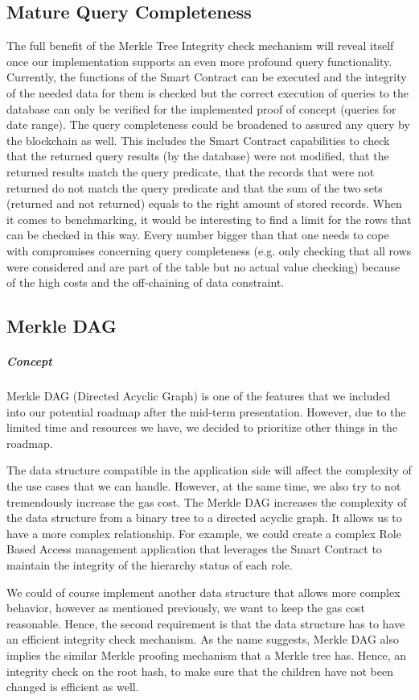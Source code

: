 \subsection{Mature Query Completeness}
The full benefit of the Merkle Tree Integrity check mechanism will reveal itself once our implementation supports an even more profound query functionality. Currently, the functions of the Smart Contract can be executed and the integrity of the needed data for them is checked but the correct execution of queries to the database can only be verified for the implemented proof of concept (queries for date range). The query completeness could be broadened to assured any query by the blockchain as well. This includes the Smart Contract capabilities to check that the returned query results (by the database) were not modified, that the returned results match the query predicate, that the records that were not returned do not match the query predicate and that the sum of the two sets (returned and not returned) equals to the right amount of stored records.
When it comes to benchmarking, it would be interesting to find a limit for the rows that can be checked in this way. Every number bigger than that one needs to cope with compromises concerning query completeness (e.g. only checking that all rows were considered and are part of the table but no actual value checking) because of the high costs and the off-chaining of data constraint.

\subsection{Merkle DAG}
\subparagraph{Concept}
Merkle DAG (Directed Acyclic Graph) is one of the features that we included into our potential roadmap after the mid-term presentation. However, due to the limited time and resources we have, we decided to prioritize other things in the roadmap.

The data structure compatible in the application side will affect the complexity of the use cases that we can handle. However, at the same time, we also try to not tremendously increase the gas cost. The Merkle DAG increases the complexity of the data structure from a binary tree to a directed acyclic graph. It allows us to have a more complex relationship. For example, we could create a complex Role Based Access management application that leverages the Smart Contract to maintain the integrity of the hierarchy status of each role.

We could of course implement another data structure that allows more complex behavior, however as mentioned previously, we want to keep the gas cost reasonable. Hence, the second requirement is that the data structure has to have an efficient integrity check mechanism. As the name suggests, Merkle DAG also implies the similar Merkle proofing mechanism that a Merkle tree has. Hence, an integrity check on the root hash, to make sure that the children have not been changed is efficient as well.

